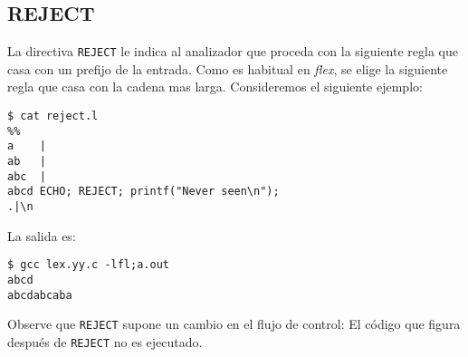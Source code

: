 % 
%
%
% 


\subsection{REJECT}
La directiva  \verb|REJECT| le indica al analizador que proceda con la 
siguiente regla que casa con un prefijo de la entrada. Como es habitual en
\emph{flex}, se elige la siguiente regla que casa  con la cadena mas
larga. Consideremos el siguiente ejemplo:
\begin{verbatim}
$ cat reject.l
%%
a    |
ab   |
abc  |
abcd ECHO; REJECT; printf("Never seen\n");
.|\n                                  
\end{verbatim}
La salida es:
\begin{verbatim}
$ gcc lex.yy.c -lfl;a.out
abcd
abcdabcaba
\end{verbatim}
Observe que \verb|REJECT| supone un cambio en el flujo de control:
El c\'odigo que figura despu\'es de \verb|REJECT| no es ejecutado.

